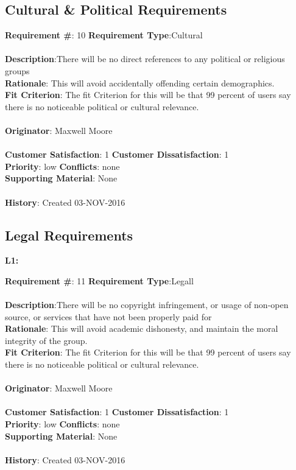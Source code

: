 \documentclass[titlepage]{article}
\begin{document}
 \subsection{Cultural \& Political Requirements}

\begin{framed}
	\noindent\textbf{Requirement \#}: 10 \hfill \textbf{Requirement Type}:Cultural \hfill\\\\
	\noindent\textbf{Description}:There will be no direct references to any political or religious groups\\
	\textbf{Rationale}: This will avoid accidentally offending certain demographics.\\
	\textbf{Fit Criterion}: The fit Criterion for this will be that 99 percent of users say there is no noticeable political or cultural relevance.\\\\
	\textbf{Originator}: Maxwell Moore\\\\
	\noindent\textbf{Customer Satisfaction}: 1 \hfill 	\textbf{Customer Dissatisfaction}: 1 \hfill\\
	\textbf{Priority}: low \hfill \textbf{Conflicts}: none \hfill\\
	\textbf{Supporting Material}: None\\\\
	\noindent\textbf{History}: Created 03-NOV-2016
\end{framed}
 
 \subsection{Legal Requirements}
 \textbf{L1:} %

\begin{framed}
	\noindent\textbf{Requirement \#}: 11 \hfill \textbf{Requirement Type}:Legall \hfill\\\\
	\noindent\textbf{Description}:There will be no copyright infringement, or usage of non-open source, or services that have not been properly paid for\\
	\textbf{Rationale}: This will avoid academic dishonesty, and maintain the moral integrity of the group.\\
	\textbf{Fit Criterion}: The fit Criterion for this will be that 99 percent of users say there is no noticeable political or cultural relevance.\\\\
	\textbf{Originator}: Maxwell Moore\\\\
	\noindent\textbf{Customer Satisfaction}: 1 \hfill 	\textbf{Customer Dissatisfaction}: 1 \hfill\\
	\textbf{Priority}: low \hfill \textbf{Conflicts}: none \hfill\\
	\textbf{Supporting Material}: None\\\\
	\noindent\textbf{History}: Created 03-NOV-2016
\end{framed}
 
\end{document}
